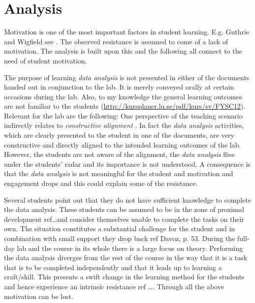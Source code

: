 \documentclass[]{article}
\begin{document}
\section*{Analysis}
Motivation is one of the most important factors in student learning. E.g. Guthrie and Wigfield see .
The observed resistance is assumed to come of a lack of motivation.
The analysis is built upon this and the following all connect to the need of student motivation.

The purpose of learning {\it data analysis} is not presented in either of the documents handed out in conjunction to the lab.
It is merely conveyed orally at certain occasions during the lab.
Also, to my knowledge the general learning outcomes are not familiar to the students (\url{http://kursplaner.lu.se/pdf/kurs/sv/FYSC12}).
Relevant for the lab are the following:
One perspective of the teaching scenario indirectly relates to {\it constructive alignment} \cite{biggs}.
In fact the {\it data analysis} activities, which are clearly presented to the student in one of the documents, are very constructive and directly aligned to the intended learning outcomes of the lab.
However, the students are not aware of the alignment, the {\it data analysis} flies under the students' radar and its importance is not understood.
A consequence is that the {\it data analysis} is not meaningful for the student and motivation and engagement drops \cite{illeris} and this could explain some of the resistance.

Several students point out that they do not have sufficient knowledge to complete the data analysis.
These students can be assumed to be in the zone of proximal development ref\dots and consider themselves unable to complete the tasks on their own.
The situation constitutes a substantial challenge for the student and in combination with small support they drop back ref Davoz, p. 53.
During the full-day lab and the course in its whole there is a large focus on theory.
Performing the data analysis diverges from the rest of the course in the way that it is a task that is to be completed independently and that it leads up to learning a craft/skill.
This presents a swift change in the learning method for the students and hence experience an intrinsic resistance ref \dots.
Through all the above motivation can be lost.
\end{document}
